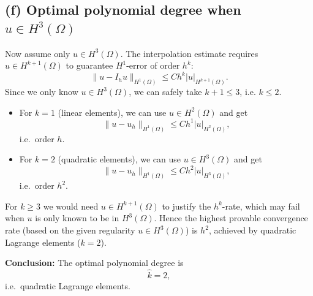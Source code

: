 \subsection*{(f) Optimal polynomial degree when $u \in H^3(\Omega)$}
Now assume only $u \in H^3(\Omega)$.
The interpolation estimate requires $u \in H^{k+1}(\Omega)$ to guarantee
$H^1$-error of order $h^k$:
\[
  \|u - I_h u\|_{H^1(\Omega)}
  \le C h^k |u|_{H^{k+1}(\Omega)}.
\]
Since we only know $u \in H^3(\Omega)$, we can safely take $k+1 \le 3$, i.e.
$k \le 2$.
\begin{itemize}
  \item For $k = 1$ (linear elements), we can use $u \in H^2(\Omega)$ and get
        \[
          \|u - u_h\|_{H^1(\Omega)} \le C h^1 |u|_{H^2(\Omega)},
        \]
        i.e.\ order $h$.
  \item For $k = 2$ (quadratic elements), we can use $u \in H^3(\Omega)$ and get
        \[
          \|u - u_h\|_{H^1(\Omega)} \le C h^2 |u|_{H^3(\Omega)},
        \]
        i.e.\ order $h^2$.
\end{itemize}
For $k \ge 3$ we would need $u \in H^{k+1}(\Omega)$ to justify the
$h^k$-rate, which may fail when $u$ is only known to be in $H^3(\Omega)$.
Hence the highest provable convergence rate (based on the given regularity
$u \in H^3(\Omega)$) is $h^2$, achieved by quadratic Lagrange elements
($k = 2$).

\textbf{Conclusion:} The optimal polynomial degree is
\[
  \boxed{\hat{k} = 2,}
\]
i.e.\ quadratic Lagrange elements.

